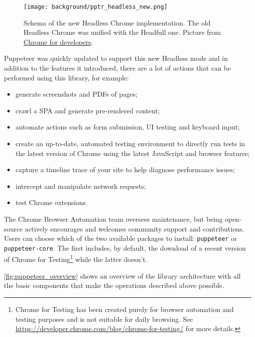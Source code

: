 \documentclass[../thesis.tex]{subfiles}
\begin{document}
\begin{figure}[H]
    \centering
    \texttt{[image: background/pptr\_headless\_new.png]}
    \caption[Schema of the new Headless Chrome implementation]{Schema of the new Headless Chrome implementation. The old Headless Chrome was unified with the Headfull one. Picture from \href{https://developer.chrome.com/static/docs/chromium/new-headless/image/the-chrome-headless-is-7ec2038d11f0b.svg}{Chrome for developers}.}
    \label{fig:puppeteer_headless_new}
\end{figure}

Puppeteer was quickly updated to support this new Headless mode and in addition to the features it introduced, there are a lot of actions that can be performed using this library, for example:

\begin{itemize}
    \item generate screenshots and PDFs of pages;
    \item crawl a \acrlong{SPA} and generate pre-rendered content;
    \item automate actions such as form submission, UI testing and keyboard input;
    \item create an up-to-date, automated testing environment to directly run tests in the latest version of Chrome using the latest JavaScript and browser features;
    \item capture a timeline trace of your site to help diagnose performance issues;
    \item intercept and manipulate network requests;
    \item test Chrome extensions.
\end{itemize}

The Chrome Browser Automation team oversees maintenance, but being open-source actively encourages and welcomes community support and contributions. Users can choose which of the two available packages to install: \texttt{puppeteer} or \texttt{puppeteer-core}. The first includes, by default, the download of a recent version of Chrome for Testing\footnote{Chrome for Testing has been created purely for browser automation and testing purposes and is not suitable for daily browsing. See \href{https://developer.chrome.com/blog/chrome-for-testing/}{https://developer.chrome.com/blog/chrome-for-testing/} for more details.} while the latter doesn't. 

\autoref{fig:puppeteer_overview} shows an overview of the library architecture with all the basic components that make the operations described above possible.
\end{document}
